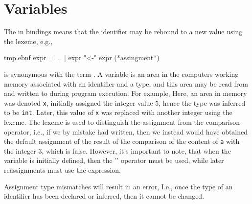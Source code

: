 \section{Variables}
\label{sec:mutableValues}
The  in  bindings means that the identifier may be rebound to a new value using the \idx{\lexeme{<-}} lexeme, e.g.,
%
\begin{verbatimwrite}{tmp.ebnf}
expr = ...
  | expr "<-" expr (*assingment*)
\end{verbatimwrite}
%
 is synonymous with the term . A variable is an area in the computers working memory associated with an identifier and a type, and this area may be read from and written to during program execution. For example,
%
%
Here, an area in memory was denoted \texttt{x}, initially assigned the integer value 5, hence the type was inferred to be \lstinline|int|.  Later, this value of \texttt{x} was replaced with another integer using the \idx{\lexeme{<-}} lexeme. The \lexeme{<-} lexeme is used to distinguish the assignment from the comparison operator, i.e., if we by mistake had written,
%
%
%
then we instead would have obtained the default assignment of the result of the comparison of the content of \lstinline|a| with the integer 3, which is false. However, it's important to note, that when the variable is initially defined, then the '\lexeme{=}' operator must be used, while later reassignments must use the \lexeme{<-} expression.

Assignment type mismatches will result in an error, 
%
%
I.e., once the type of an identifier has been declared or inferred, then it cannot be changed.

